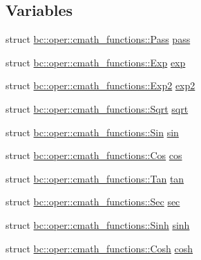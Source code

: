 \subsection*{Variables}
\begin{DoxyCompactItemize}
\item 
struct \hyperlink{structbc_1_1oper_1_1cmath__functions_1_1Pass}{bc\+::oper\+::cmath\+\_\+functions\+::\+Pass} \hyperlink{namespacebc_1_1oper_1_1cmath__functions_a9dd42da140176c84d6ede52a57b47fcf}{pass}
\item 
struct \hyperlink{structbc_1_1oper_1_1cmath__functions_1_1Exp}{bc\+::oper\+::cmath\+\_\+functions\+::\+Exp} \hyperlink{namespacebc_1_1oper_1_1cmath__functions_a2843a3ce6edfc8c4395cf2754348aaf9}{exp}
\item 
struct \hyperlink{structbc_1_1oper_1_1cmath__functions_1_1Exp2}{bc\+::oper\+::cmath\+\_\+functions\+::\+Exp2} \hyperlink{namespacebc_1_1oper_1_1cmath__functions_a27e672f8796339c92730627404e915d8}{exp2}
\item 
struct \hyperlink{structbc_1_1oper_1_1cmath__functions_1_1Sqrt}{bc\+::oper\+::cmath\+\_\+functions\+::\+Sqrt} \hyperlink{namespacebc_1_1oper_1_1cmath__functions_ac4449711290e599a4227690d5fe4babe}{sqrt}
\item 
struct \hyperlink{structbc_1_1oper_1_1cmath__functions_1_1Sin}{bc\+::oper\+::cmath\+\_\+functions\+::\+Sin} \hyperlink{namespacebc_1_1oper_1_1cmath__functions_a5dc50359e97edb2956aebd961c3887bf}{sin}
\item 
struct \hyperlink{structbc_1_1oper_1_1cmath__functions_1_1Cos}{bc\+::oper\+::cmath\+\_\+functions\+::\+Cos} \hyperlink{namespacebc_1_1oper_1_1cmath__functions_a20bb344aea6dba5c48ef7014921dc468}{cos}
\item 
struct \hyperlink{structbc_1_1oper_1_1cmath__functions_1_1Tan}{bc\+::oper\+::cmath\+\_\+functions\+::\+Tan} \hyperlink{namespacebc_1_1oper_1_1cmath__functions_a90b54d1a21cfe0a38460d448a09f746a}{tan}
\item 
struct \hyperlink{structbc_1_1oper_1_1cmath__functions_1_1Sec}{bc\+::oper\+::cmath\+\_\+functions\+::\+Sec} \hyperlink{namespacebc_1_1oper_1_1cmath__functions_a5957c7023f2fa332e8639937150a0370}{sec}
\item 
struct \hyperlink{structbc_1_1oper_1_1cmath__functions_1_1Sinh}{bc\+::oper\+::cmath\+\_\+functions\+::\+Sinh} \hyperlink{namespacebc_1_1oper_1_1cmath__functions_ac77a026f6f63e4497760a6a0619b2f80}{sinh}
\item 
struct \hyperlink{structbc_1_1oper_1_1cmath__functions_1_1Cosh}{bc\+::oper\+::cmath\+\_\+functions\+::\+Cosh} \hyperlink{namespacebc_1_1oper_1_1cmath__functions_aaacbf4194d8a898ef15f9c54db99ed15}{cosh}

\end{DoxyCompactItemize}
